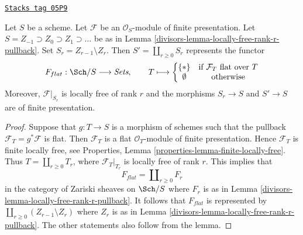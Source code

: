 \begin{lemma}
\label{divisors-lemma-finite-presentation-module}
\href{https://stacks.math.columbia.edu/tag/05P9}{\texttt{Stacks tag 05P9}}

Let $S$ be a scheme. Let $\mathcal{F}$ be an $\mathcal{O}_S$-module
of finite presentation. Let $S = Z_{-1} \supset Z_0 \supset Z_1 \supset \ldots$
be as in Lemma \ref{divisors-lemma-locally-free-rank-r-pullback}.
Set $S_r = Z_{r - 1} \setminus Z_r$.
Then $S' = \coprod_{r \geq 0} S_r$ represents the functor
$$
F_{flat} : \Sch/S \longrightarrow \textit{Sets},\quad\quad
T \longmapsto
\left\{
\begin{matrix}
\{*\} & \text{if }\mathcal{F}_T\text{ flat over }T\\
\emptyset & \text{otherwise}
\end{matrix}
\right.
$$
Moreover, $\mathcal{F}|_{S_r}$ is locally free of rank $r$ and the
morphisms $S_r \to S$ and $S' \to S$ are of finite presentation.
\end{lemma}

\begin{proof}

Suppose that $g : T \to S$ is a morphism of schemes such that the pullback
$\mathcal{F}_T = g^*\mathcal{F}$ is flat. Then $\mathcal{F}_T$ is a flat
$\mathcal{O}_T$-module of finite presentation. Hence
$\mathcal{F}_T$ is finite locally free, see
Properties, Lemma \ref{properties-lemma-finite-locally-free}.
Thus $T = \coprod_{r \geq 0} T_r$, where $\mathcal{F}_T|_{T_r}$ is locally
free of rank $r$. This implies that
$$
F_{flat} = \coprod\nolimits_{r \geq 0} F_r
$$
in the category of Zariski sheaves on $\Sch/S$ where $F_r$ is as in
Lemma \ref{divisors-lemma-locally-free-rank-r-pullback}. It follows
that $F_{flat}$ is represented by
$\coprod_{r \geq 0} (Z_{r - 1} \setminus Z_r)$ where
$Z_r$ is as in
Lemma \ref{divisors-lemma-locally-free-rank-r-pullback}.
The other statements also follow from the lemma.
\end{proof}


